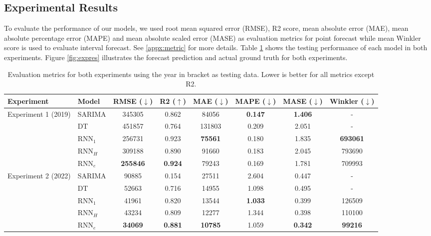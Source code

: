 \documentclass{article}
\begin{document}
\subsection{Experimental Results}
To evaluate the performance of our models, we used root mean squared error (RMSE), R2 score, mean absolute error (MAE), mean absolute percentage error (MAPE) and mean absolute scaled error (MASE) \cite{hyndman2006} as evaluation metrics for point forecast while mean Winkler score \cite{winkler} is used to evaluate interval forecast. See \ref{appx:metric} for more details. Table \ref{table:expres} shows the testing performance of each model in both experiments. Figure \ref{fig:expres} illustrates the forecast prediction and actual ground truth for both experiments.

\begin{table}[htbp]
\small
    \centering
        \begin{tabular}{l|l|cccccc}
            Experiment & Model & RMSE ($\downarrow$) & R2 ($\uparrow$) & MAE ($\downarrow$) & MAPE ($\downarrow$) & MASE ($\downarrow$) & Winkler ($\downarrow$) \\
            \hline
            \multirow{5}{*}{Experiment 1 (2019)} & SARIMA & 345305 & 0.862 & 84056 & \textbf{0.147} & \textbf{1.406} & - \\
                               & DT & 451857 & 0.764 & 131803 & 0.209 & 2.051 & - \\
                               & RNN$_1$ & 256731 & 0.923 & \textbf{75561} & 0.180 & 1.835 & \textbf{693061} \\
                               & RNN$_H$ & 309188 & 0.890 & 91660 & 0.183 & 2.045 & 793690 \\
                               & RNN$_e$ & \textbf{255846} & \textbf{0.924} & 79243 & 0.169 & 1.781 & 709993 \\
            \hline
            \multirow{5}{*}{Experiment 2 (2022)} & SARIMA & 90885 & 0.154 & 27511 & 2.604 & 0.447 & - \\
                               & DT & 52663 & 0.716 & 14955 & 1.098 & 0.495 & - \\
                               & RNN$_1$ & 41961 & 0.820 & 13544 & \textbf{1.033} & 0.399 & 126509 \\
                               & RNN$_H$ & 43234 & 0.809 & 12277 & 1.344 & 0.398 & 110100 \\
                               & RNN$_e$ & \textbf{34069} & \textbf{0.881} & \textbf{10785} & 1.059 & \textbf{0.342} & \textbf{99216} \\
        \end{tabular}
    \caption{Evaluation metrics for both experiments using the year in bracket as testing data. Lower is better for all metrics except R2.}
    \label{table:expres}
\end{table}
\end{document}
